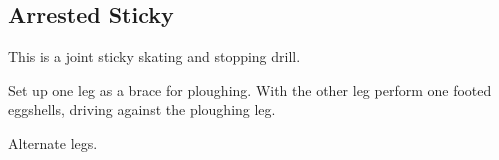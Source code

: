 \subsection{Arrested Sticky}

This is a joint sticky skating and stopping drill.

Set up one leg as a brace for ploughing.
With the other leg perform one footed eggshells, driving against the ploughing leg.

Alternate legs. 
